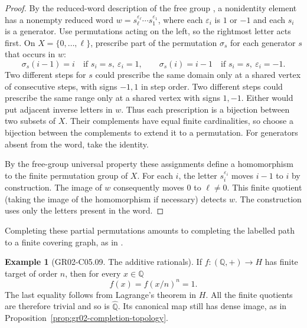 \documentclass[11pt,oneside,openany]{book}
\theoremstyle{definition}
\newtheorem{example}[theorem]{Example}
\theoremstyle{remark}
\begin{document}
\begin{proof}
By the reduced-word description of the free group
\cite[Result A01]{geomgroup}, a nonidentity element has a nonempty
reduced word \(w=s_{\ell}^{\varepsilon_{\ell}}\cdots
s_1^{\varepsilon_1}\), where each \(\varepsilon_i\) is \(1\) or
\(-1\) and each \(s_i\) is a generator. Use permutations acting
on the left, so the rightmost letter acts first. On
\(X=\{0,\ldots,\ell\}\), prescribe part of the permutation
\(\sigma_s\) for each generator \(s\) that occurs in \(w\):
\[
   \sigma_s(i-1)=i\quad\text{if }s_i=s,\ \varepsilon_i=1,\qquad
   \sigma_s(i)=i-1\quad\text{if }s_i=s,\ \varepsilon_i=-1.
\]
Two different steps for \(s\) could prescribe the same domain
only at a shared vertex of consecutive steps, with signs
\(-1,1\) in step order. Two different steps could prescribe the
same range only at a shared vertex with signs \(1,-1\).
Either would put adjacent inverse letters in \(w\).
Thus each prescription is a bijection between two subsets of \(X\).
Their complements have equal finite cardinalities, so choose a
bijection between the complements to extend it to a permutation.
For generators absent from the word, take the identity.

By the free-group universal property these assignments define a
homomorphism to the finite permutation group of \(X\).
For each \(i\), the letter \(s_i^{\varepsilon_i}\) moves
\(i-1\) to \(i\) by construction. The image of \(w\) consequently
moves \(0\) to \(\ell\ne 0\). This finite quotient (taking the
image of the homomorphism if necessary) detects \(w\).
The construction uses only the letters present in the word.
\end{proof}

Completing these partial permutations amounts to completing the
labelled path to a finite covering graph, as in
\cite[Theorem 3.2.1, first proof]{profinite-source}.

\begin{example}[GR02-C05.09. The additive rationals]
\label{ex:gr02-rationals-completion}
If \(f\colon(\mathbb Q,+)\to H\) has finite target of order \(n\),
then for every \(x\in\mathbb Q\)
\[
   f(x)=f(x/n)^n=1.
\]
The last equality follows from Lagrange's theorem in \(H\).
All the finite quotients are therefore trivial and so is
\(\widehat{\mathbb Q}\). Its canonical map still has dense image,
as in Proposition~\ref{prop:gr02-completion-topology}.
\end{example}
\end{document}
